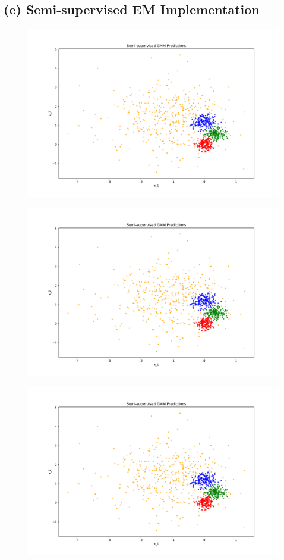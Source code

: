 \documentclass[11pt]{article}
\begin{document}
	\subsection{(e) Semi-supervised EM Implementation}
	\begin{figure}[H]
		\centering
		\includegraphics[width=\linewidth]{src/semi_supervised_em/pred_ss_0.pdf}
	\end{figure}
	\begin{figure}[H]
		\centering
		\includegraphics[width=\linewidth]{src/semi_supervised_em/pred_ss_1.pdf}
	\end{figure}
	\begin{figure}[H]
		\centering
		\includegraphics[width=\linewidth]{src/semi_supervised_em/pred_ss_2.pdf}
	\end{figure}
	
\end{document}
